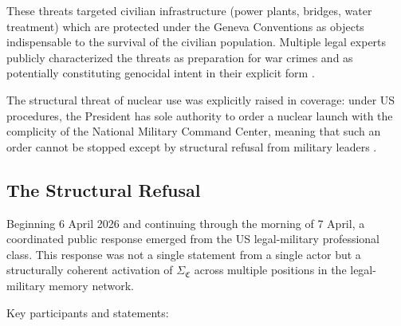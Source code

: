 \documentclass[12pt,a4paper]{article}
\newcommand{\SigmaCF}{\Sigma_{\mathfrak{C}}}  %
\begin{document}
These threats targeted civilian infrastructure (power plants, bridges, water treatment) which are protected under the Geneva Conventions as objects indispensable to the survival of the civilian population. Multiple legal experts publicly characterized the threats as preparation for war crimes and as potentially constituting genocidal intent in their explicit form \cite{intercept_trump,wapo_war_crime}.

The structural threat of nuclear use was explicitly raised in coverage: under US procedures, the President has sole authority to order a nuclear launch with the complicity of the National Military Command Center, meaning that such an order cannot be stopped except by structural refusal from military leaders \cite{nationaltoday_dilemma}.

\subsection{The Structural Refusal}

Beginning 6 April 2026 and continuing through the morning of 7 April, a coordinated public response emerged from the US legal-military professional class. This response was not a single statement from a single actor but a structurally coherent activation of $\SigmaCF$ across multiple positions in the legal-military memory network.

Key participants and statements:
\end{document}
